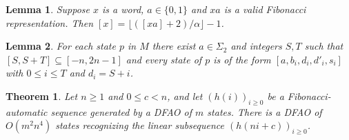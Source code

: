 \documentclass[10pt,a4paper]{amsart}
\newtheorem{lemma}{Lemma}
\newtheorem{theorem}{Theorem}
\begin{document}
\begin{lemma}
Suppose $x$ is a word, $a \in \{0,1\}$ and $xa$ is a valid Fibonacci representation.
Then $[x] = \lfloor ([xa]+2)/\alpha \rfloor - 1$.
\label{lemma:[x]-floor}
\end{lemma}

\begin{lemma}
For each state $p$ in $M$
there exist $a \in \Sigma_2$ and integers $S, T$ such 
that $[S, S+T] \subseteq [-n,2n-1]$ and every state of $p$ is of the form
$[a, b_i, d_i, d'_i, s_i]$ 
with $0 \leq i \leq T$ and $d_i = S+i$.
\label{lemma:lin-subseq-consec}
\end{lemma}

\begin{theorem}
Let $n \geq 1$ and $0 \leq c < n$, and let $(h(i))_{i \geq 0}$ be a Fibonacci-automatic sequence generated by a DFAO of $m$ states.  There is a DFAO of
$O(m^2n^4)$ states recognizing the linear subsequence
$(h(ni+c))_{i \geq 0}$.
\label{theorem:lin-subseq-sc}
\end{theorem}
\end{document}
